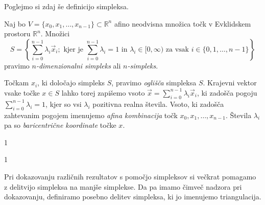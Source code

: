 \documentclass[mat1]{fmfdelo}
\newcommand{\R}{\mathbb R}
\newcommand{\0}{\underline{0}}
\begin{document}
Poglejmo si zdaj še definicijo simpleksa.
\begin{definicija}
Naj bo $V = \{x_0, x_1, \dots , x_{n-1} \} \subset \R^n$ afino neodvisna množica točk v Evklidskem prostoru $\R^n$. Množici 
$$S = \left\{\sum\limits_{i=0}^{n-1} \lambda_i \vec{x}_i; \text{ kjer je } \sum\limits_{i=0}^{n-1} \lambda_i = 1 \text{ in } \lambda_i \in [0, \infty) \text{ za vsak } i \in \{0, 1, \dots, n-1 \}\right\}$$
pravimo \emph{$n$-dimenzionalni simpleks} ali \emph{$n$-simpleks}.
\end{definicija}
Točkam $x_i$, ki določajo simpleks $S$, pravimo \emph{oglišča} simpleksa $S$. Krajevni vektor vsake točke $x \in S$ lahko torej zapišemo vsoto $\vec{x} = \sum\limits_{i=0}^{n-1} \lambda_i \vec{x}_i$, ki zadošča pogoju $\sum\limits_{i=0}^{n-1} \lambda_i = 1$, kjer so vsi $\lambda_i$ pozitivna realna števila. Vsoto, ki zadošča zahtevanim pogojem imenujemo \emph{afina kombinacija} točk $x_0, x_1, \dots , x_{n-1}$. Števila $\lambda_i$ pa so \emph{baricentrične koordinate} točke $x$.

1

1


Pri dokazovanju različnih rezultatov s pomočjo simpleksov si večkrat pomagamo z delitvijo simpleksa na manjše simplekse. Da pa imamo čimveč nadzora pri dokazovanju, definiramo posebno delitev simpleksa, ki jo imenujemo triangulacija.
\end{document}
